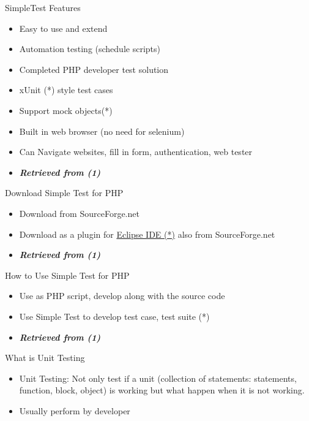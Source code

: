 \documentclass[
  ignorenonframetext,
]{beamer}
\providecommand{\tightlist}{%
  \setlength{\itemsep}{0pt}\setlength{\parskip}{0pt}}
\begin{document}
\begin{frame}{SimpleTest Features}
\protect\hypertarget{simpletest-features}{}
\begin{itemize}
\tightlist
\item
  Easy to use and extend
\item
  Automation testing (schedule scripts)
\item
  Completed PHP developer test solution
\item
  xUnit (*) style test cases
\item
  Support mock objects(*)
\item
  Built in web browser (no need for selenium)
\item
  Can Navigate websites, fill in form, authentication, web tester
\item
  \emph{\textbf{Retrieved from (1)}}
\end{itemize}
\end{frame}

\begin{frame}{Download Simple Test for PHP}
\protect\hypertarget{download-simple-test-for-php}{}
\begin{itemize}
\tightlist
\item
  Download from SourceForge.net
\item
  Download as a plugin for
  \href{https://sourceforge.net/projects/simpletest/files/eclipse\%20plugin/}{Eclipse
  IDE (*)} also from SourceForge.net
\item
  \emph{\textbf{Retrieved from (1)}}
\end{itemize}
\end{frame}

\begin{frame}{How to Use Simple Test for PHP}
\protect\hypertarget{how-to-use-simple-test-for-php}{}
\begin{itemize}
\tightlist
\item
  Use as PHP script, develop along with the source code
\item
  Use Simple Test to develop test case, test suite (*)
\item
  \emph{\textbf{Retrieved from (1)}}
\end{itemize}
\end{frame}

\begin{frame}{What is Unit Testing}
\protect\hypertarget{what-is-unit-testing}{}
\begin{itemize}
\tightlist
\item
  Unit Testing: Not only test if a unit (collection of statements:
  statements, function, block, object) is working but what happen when
  it is not working.
\item
  Usually perform by developer
\end{itemize}
\end{frame}
\end{document}
